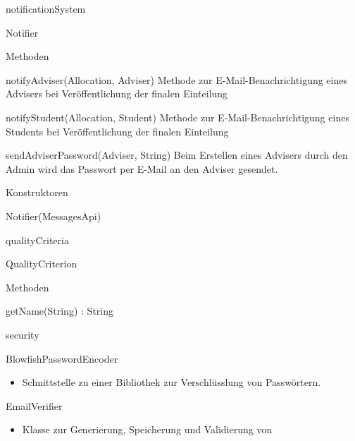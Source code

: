 \documentclass[parskip=full]{scrartcl}
\newcommand{\changeDescription}[1]{{\newline\color{black}\normalfont #1}}
\newcommand{\code}[1]{{\ttfamily #1}}
\begin{document}
\begin{itemPackage}
\begin{itemClass}
\end{itemClass}
\item notificationSystem
\begin{itemClass}
\item Notifier
\begin{itemClassSub}
\item Methoden
\begin{itemPlus}
\item notifyAdviser(Allocation, Adviser) \changeDescription{Methode zur
E-Mail-Benachrichtigung eines \code{Advisers} bei Veröffentlichung der finalen
Einteilung}
\item notifyStudent(Allocation, Student) \changeDescription{Methode zur
E-Mail-Benachrichtigung eines \code{Students} bei Veröffentlichung der finalen
Einteilung}
\item sendAdviserPassword(Adviser, String) \changeDescription{Beim Erstellen
eines \code{Advisers} durch den Admin wird das Passwort per E-Mail an den
Adviser gesendet.}
\end{itemPlus}
\item Konstruktoren
\begin{itemPlus}
\item Notifier(MessagesApi)
\end{itemPlus}
\end{itemClassSub}
\end{itemClass}
\item qualityCriteria
\begin{itemClass}
\item QualityCriterion
\begin{itemClassSub}
\item Methoden
\begin{itemPlus}
\item getName(String) : String
\end{itemPlus}
\end{itemClassSub}
\end{itemClass}
\item security
\begin{itemClass}
\item BlowfishPasswordEncoder
	\begin{itemize}
	  \item Schnittstelle zu einer Bibliothek zur Verschlüsslung von Passwörtern.
	\end{itemize}
\item EmailVerifier
 \begin{itemize}
	  \item Klasse zur Generierung, Speicherung und Validierung von

\end{itemize}
\end{itemClass}
\end{itemPackage}
\end{document}
